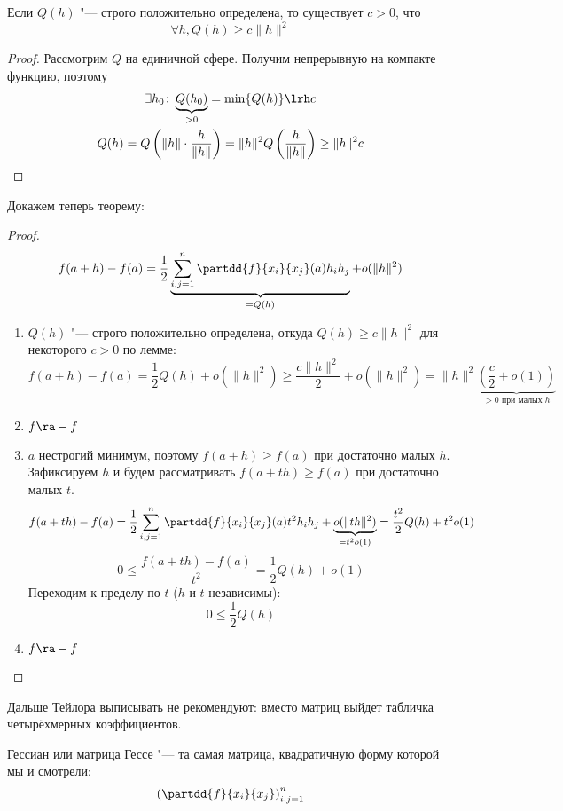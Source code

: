
\begin{lemma}
	Если $Q(h)$ "--- строго положительно определена, то существует $c > 0$, что
	\[ \forall h, Q(h) \ge c\|h\|^2 \]
\end{lemma}
\begin{proof}
	Рассмотрим $Q$ на единичной сфере. Получим непрерывную на компакте функцию, поэтому
	\begin{gather*}
		\exists h_0\colon \underbrace{Q(h_0)}_{>0} = \min \{Q(h)\} \lrh c \\
		Q(h) = Q\left(\|h\| \cdot \frac{h}{\|h\|}\right) = \|h\|^2 Q\left(\frac{h}{\|h\|}\right) \ge \|h\|^2 c
	\end{gather*}
\end{proof}

Докажем теперь теорему:
\begin{proof}
	\[ f(a + h) - f(a) = \frac12 \underbrace{\sum_{i,j = 1}^n \partdd{f}{x_i}{x_j}(a) h_ih_j}_{=Q(h)} + o(\|h\|^2) \]
	\begin{enumerate}
	\item
		$Q(h)$ "--- строго положительно определена, откуда $Q(h) \ge c \|h\|^2$ для некоторого $c>0$ по лемме:
		\[  f(a+h) - f(a) = \frac12 Q(h) + o(\|h\|^2) \ge \frac{c\|h\|^2}2 + o(\|h\|^2) = \|h\|^2 \underbrace{\left(\frac{c}2 + o(1)\right)}_{\text{$>0$ при малых $h$}} \]

	\item $f \ra -f$

	\item
		$a$ нестрогий минимум, поэтому $f(a+h) \ge f(a)$ при достаточно малых $h$.
		Зафиксируем $h$ и будем рассматривать $f(a+th) \ge f(a)$ при достаточно малых $t$.
		\[ f(a+th) - f(a) = \frac12 \sum_{i,j = 1}^n \partdd{f}{x_i}{x_j}(a) t^2h_ih_j + \underbrace{o(\|th\|^2)}_{=t^2o(1)} = \frac{t^2}2 Q(h) + t^2o(1)\]
		\[ 0 \le \frac{f(a+th) - f(a)}{t^2} = \frac12 Q(h) + o(1) \]
		Переходим к пределу по $t$ ($h$ и $t$ независимы):
		\[ 0 \le \frac12 Q(h) \]

	\item $f \ra -f$
	\end{enumerate}
\end{proof}

Дальше Тейлора выписывать не рекомендуют: вместо матриц выйдет табличка четырёхмерных коэффициентов.

\begin{Def}
	Гессиан или матрица Гессе "--- та самая матрица, квадратичную форму которой мы и смотрели:
	\[ \left( \partdd{f}{x_i}{x_j}\right)_{i,j=1}^n \]
\end{Def}

